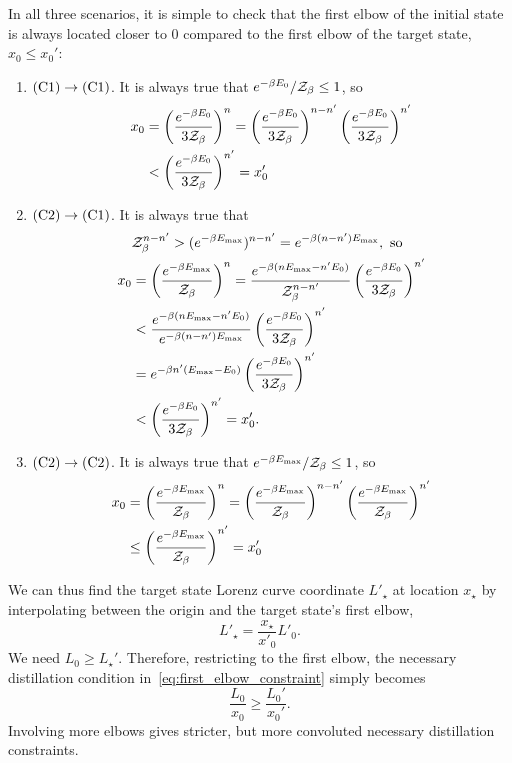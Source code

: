 \documentclass[pra,
aps,
twocolumn,
superscriptaddress,
groupedaddress,
nofootinbib,
reprint
]{revtex4-1}
\begin{document}
In all three scenarios, it is simple to check that the first elbow of the initial state is always located closer to $0$ compared to the first elbow of the target state, $x_0 \leq x_0'$:
\begin{enumerate}
	\item $\rm{(C1)} \rightarrow \rm{(C1)}$. 
	It is always true that $e^{-\beta E_0} / \mathcal{Z}_\beta \leq 1$, so
	\begin{align*}
		x_0 &= \left(\dfrac{e^{-\beta E_0}}{3\mathcal{Z}_\beta}\right)^n = \left(\dfrac{e^{-\beta E_0}}{3\mathcal{Z}_\beta}\right)^{n-n'} \left(\dfrac{e^{-\beta E_0}}{3\mathcal{Z}_\beta}\right)^{n'} \\
		&< \left(\dfrac{e^{-\beta E_0}}{3\mathcal{Z}_\beta}\right)^{n'} = x_0'		
	\end{align*}
	\item $\rm{(C2)} \rightarrow \rm{(C1)}$.
	It is always true that
	\begin{align*}
		&\mathcal{Z}_\beta^{n-n'} > (e^{-\beta E_{\rm{max}}})^{n-n'} = e^{-\beta (n-n') E_{\rm{max}}}, \text{ so} \\
		x_0 &= \left(\dfrac{e^{-\beta E_{\rm{max}}}}{\mathcal{Z}_\beta}\right)^n = \dfrac{e^{-\beta(n E_{\rm{max}} - n' E_0)}}{\mathcal{Z}_\beta^{n-n'}} \left(\dfrac{e^{-\beta E_0}}{3\mathcal{Z}_\beta}\right)^{n'} \\
		&< \dfrac{e^{-\beta(n E_{\rm{max}} - n' E_0)}}{e^{-\beta (n-n') E_{\rm{max}}}} \left(\dfrac{e^{-\beta E_0}}{3\mathcal{Z}_\beta}\right)^{n'} \\
		&= e^{-\beta n' (E_{\rm{max}} - E_0)} \left(\dfrac{e^{-\beta E_0}}{3\mathcal{Z}_\beta}\right)^{n'} \\
		&< \left(\dfrac{e^{-\beta E_0}}{3\mathcal{Z}_\beta}\right)^{n'} = x_0'.
	\end{align*}
	\item $\rm{(C2)} \rightarrow \rm{(C2)}$.
	It is always true that $e^{-\beta E_{\rm{max}}} / \mathcal{Z}_\beta \leq 1$, so
	\begin{align*}
		x_0 &= \left(\dfrac{e^{-\beta E_{\rm{max}}}}{\mathcal{Z}_\beta}\right)^n = \left(\dfrac{e^{-\beta E_{\rm{max}}}}{\mathcal{Z}_\beta}\right)^{n-n'} \left(\dfrac{e^{-\beta E_{\rm{max}}}}{\mathcal{Z}_\beta}\right)^{n'} \\
		&\leq \left(\dfrac{e^{-\beta E_{\rm{max}}}}{\mathcal{Z}_\beta}\right)^{n'} = x_0'	
	\end{align*}
\end{enumerate}
We can thus find the target state Lorenz curve coordinate $L'_\star$ at location $x_\star$ by interpolating between the origin and the target state's first elbow, 
\begin{equation}\label{eq:constraint_deriv_temp}
	L'_\star = \frac{x_\star}{x'_0}L'_0.
\end{equation}
We need $L_0 \geq L_\star'$. Therefore, restricting to the first elbow, the necessary distillation condition in~\cref{eq:first_elbow_constraint} simply becomes
\begin{equation}\label{eq:first_elb_bound}
	\frac{L_0}{x_0} \geq \frac{L_0'}{x_0'}.
\end{equation}
Involving more elbows gives stricter, but more convoluted necessary distillation constraints.
\end{document}

